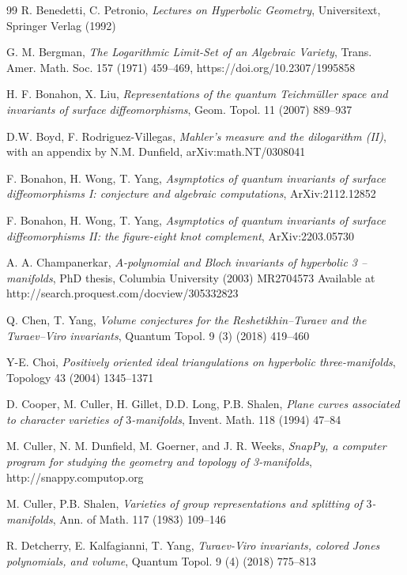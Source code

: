 \documentclass[11pt]{amsart}
\begin{document}
\begin{thebibliography}{99}
 R. Benedetti, C. Petronio, \emph{Lectures on Hyperbolic Geometry}, Universitext, Springer Verlag (1992)

 G. M. Bergman, {\it The Logarithmic Limit-Set of an Algebraic Variety}, Trans. Amer. Math. Soc. 157 (1971) 459--469, https://doi.org/10.2307/1995858

 H. F. Bonahon, X. Liu, \emph{Representations of the quantum Teichm\"uller space and invariants of surface diffeomorphisms}, Geom. Topol. 11 (2007) 889--937

 D.W. Boyd, F. Rodriguez-Villegas, \emph{Mahler's measure and the dilogarithm (II)}, with an appendix by N.M. Dunfield, arXiv:math.NT/0308041

 F. Bonahon, H. Wong, T. Yang, \emph{\it Asymptotics of quantum invariants of surface diffeomorphisms I: conjecture and algebraic computations}, ArXiv:2112.12852

 F. Bonahon, H. Wong, T. Yang, \emph{\it Asymptotics of quantum invariants of surface diffeomorphisms II: the figure-eight knot complement}, ArXiv:2203.05730 

 A. A. Champanerkar, {\it $A$-polynomial and Bloch invariants of hyperbolic 3 –manifolds}, PhD thesis, Columbia University (2003) MR2704573 Available at http://search.proquest.com/docview/305332823

 Q. Chen, T. Yang, \emph{Volume conjectures for the Reshetikhin–Turaev and the Turaev–Viro invariants},  Quantum Topol. 9 (3) (2018) 419--460

 Y-E. Choi, \emph{Positively oriented ideal triangulations on hyperbolic three-manifolds}, Topology 43 (2004) 1345--1371

 D. Cooper, M. Culler, H. Gillet, D.D. Long, P.B. Shalen, \emph{Plane curves associated to character varieties of $3$-manifolds}, Invent. Math. 118 (1994) 47--84

 M. Culler, N. M. Dunfield, M. Goerner, and J. R. Weeks, \emph{SnapPy, a computer program for studying the geometry and topology of 3-manifolds}, http://snappy.computop.org

 M. Culler, P.B. Shalen, \emph{Varieties of group representations and splitting of $3$-manifolds}, Ann. of Math. 117 (1983) 109--146

 R. Detcherry, E. Kalfagianni,  T. Yang, {\it Turaev-Viro invariants, colored Jones polynomials, and volume}, Quantum Topol. 9 (4) (2018) 775--813


\end{thebibliography}
\end{document}
